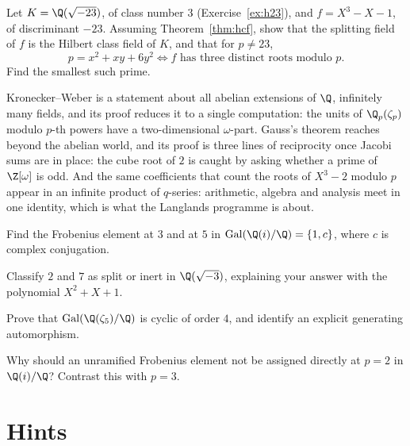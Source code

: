 \begin{exercise}[$\star\star\star$]\label{ex:h23cft}
Let $K=\Q(\sqrt{-23})$, of class number $3$ (Exercise~\ref{ex:h23}), and $f=X^3-X-1$, of discriminant $-23$. Assuming Theorem~\ref{thm:hcf}, show that the
splitting field of $f$ is the Hilbert class field of $K$, and that for $p\ne23$,
\[
p=x^2+xy+6y^2\iff f\text{ has three distinct roots modulo }p.
\]
Find the smallest such prime.
\end{exercise}

\begin{beauty}
Kronecker--Weber is a statement about all abelian extensions of $\Q$, infinitely many fields, and its proof reduces it to a single computation: the
units of $\Q_p(\zeta_p)$ modulo $p$-th powers have a two-dimensional $\omega$-part. Gauss's theorem reaches beyond the abelian world, and its proof is
three lines of reciprocity once Jacobi sums are in place: the cube root of $2$ is caught by asking whether a prime of $\Z[\omega]$ is odd. And the same
coefficients that count the roots of $X^3-2$ modulo $p$ appear in an infinite product of $q$-series: arithmetic, algebra and analysis meet in one
identity, which is what the Langlands programme is about.
\end{beauty}

\begin{exercise}[$\star$]\label{ex:v13-extra-13-1}
Find the Frobenius element at $3$ and at $5$ in $\operatorname{Gal}(\Q(i)/\Q)=\{1,c\}$, where $c$ is complex conjugation.
\end{exercise}

\begin{exercise}[$\star$]\label{ex:v13-extra-13-2}
Classify $2$ and $7$ as split or inert in $\Q(\sqrt{-3})$, explaining your answer with the polynomial $X^2+X+1$.
\end{exercise}

\begin{exercise}[$\star\star$]\label{ex:v13-extra-13-3}
Prove that $\operatorname{Gal}(\Q(\zeta_5)/\Q)$ is cyclic of order $4$, and identify an explicit generating automorphism.
\end{exercise}

\begin{exercise}[$\star\star\star$]\label{ex:v13-extra-13-4}
Why should an unramified Frobenius element not be assigned directly at $p=2$ in $\Q(i)/\Q$? Contrast this with $p=3$.
\end{exercise}

\section{Hints}

